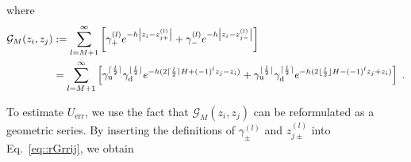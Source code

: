 where 
\begin{equation}\label{eq::rGrrij}
 \begin{split}
        \mathcal{G}_{M}(z_i,z_j)&:=\sum\limits_{l=M+1}^{\infty}\left[\gamma_+^{(l)}e^{-h\left|z_i-z_{j+}^{(l)}\right|}+\gamma_-^{(l)}e^{-h\left|z_i-z_{j-}^{(l)}\right|}\right]\; \\
        &= \sum\limits_{l = M + 1}^{\infty} \left[ \gamma_{\text{u}}^{\lceil \frac{l}{2} \rceil}\gamma_{\text{d}}^{\lfloor \frac{l}{2} \rfloor} e^{-h (2 \lceil \frac{l}{2} \rceil H + (-1)^l z_j - z_i)} + \gamma_{\text{u}}^{\lfloor \frac{l}{2} \rfloor}\gamma_{\text{d}}^{\lceil \frac{l}{2} \rceil} e^{-h (2 \lfloor \frac{l}{2} \rfloor H - (-1)^l z_j + z_i)} \right]\;.
    \end{split}
\end{equation}

To estimate $U_{\text{err}}$, we use the fact that $\mathcal{G}_{M}(z_i,z_j)$ can be reformulated as a geometric series. By inserting the definitions of $\gamma_{\pm}^{(l)}$ and $z_{j \pm}^{(l)}$ into Eq.~\eqref{eq::rGrrij}, we obtain 

